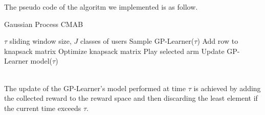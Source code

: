 The pseudo code of the algoritm we implemented is as follow.
\begin{algorithm}
	\caption{Gaussian Process CMAB}
	\begin{algorithmic}[1]
		\renewcommand{\algorithmicrequire}{\textbf{Input:}}
		\REQUIRE $\tau$ sliding window size, $J$ classes of users
		\STATE Sample GP-Learner($\tau$)
		\STATE Add row to knapsack matrix
		\ENDFOR
		\STATE Optimize knapsack matrix
		\STATE Play selected arm
		\STATE Update GP-Learner model($\tau$)
	\end{algorithmic}
\end{algorithm}
\\The update of the GP-Learner's model performed at time $\tau$ is achieved by adding the collected reward to the reward space and then discarding the least element if the current time exceeds $\tau$.